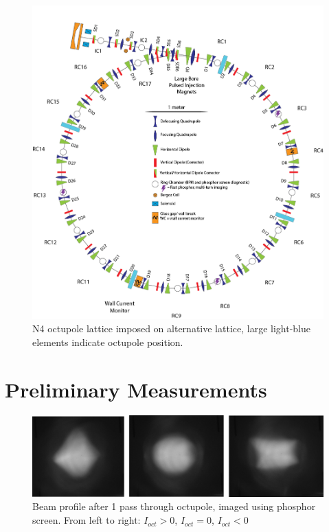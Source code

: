 \begin{figure}[]
   \centering
   \includegraphics[width=\textwidth]{umer-diagram/altlat_N4octu_full_ring_labels.png}
   \caption{N4 octupole lattice imposed on alternative lattice, large light-blue elements indicate octupole position.}
   \label{fig:N4lattice}
\end{figure}



\section{Preliminary Measurements}

\begin{figure}[]
   \centering
    \includegraphics[width=\textwidth]{6.figures/oct_profile.png}
 	\caption{Beam profile after 1 pass through octupole, imaged using phosphor screen. From left to right: $I_{oct} >0$, $I_{oct} =0$, $I_{oct} <0$}
   \label{fig:beam-pass-through-octu}
\end{figure}


